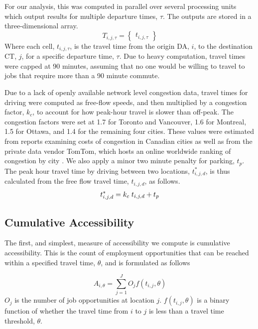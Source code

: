 \documentclass[11 pt, letterpaper]{article}
\begin{document}
{%

For our analysis, this was computed in parallel over several processing units which output results for multiple departure times, $\tau$. The outputs are stored in a three-dimensional array. 
\begin{equation}
T_{i,j,\tau} = \begin{Bmatrix}{t_{i,j,\tau}}\end{Bmatrix}
\end{equation}
Where each cell, $t_{i,j,\tau}$, is the travel time from the origin DA, $i$, to the destination CT, $j$, for a specific departure time, $\tau$. Due to heavy computation, travel times were capped at 90 minutes, assuming that no one would be willing to travel to jobs that require more than a 90 minute commute.

Due to a lack of openly available network level congestion data, travel times for driving were computed as free-flow speeds, and then multiplied by a congestion factor, $k_c$, to account for how peak-hour travel is slower than off-peak. The congestion factors were set at 1.7 for Toronto and Vancouver, 1.6 for Montreal, 1.5 for Ottawa, and 1.4 for the remaining four cities. These values were estimated from reports examining costs of congestion in Canadian cities \cite{metrolinx2008,cong2012} as well as from the private data vendor TomTom, which hosts an online worldwide ranking of congestion by city \cite{tomtom2018}. We also apply a minor two minute penalty for parking, $t_p$. The peak hour travel time by driving between two locations, $t_{i,j,d}^*$, is thus calculated from the free flow travel time, $t_{i,j,d}$, as follows.
\begin{equation}
t_{i,j,d}^* = k_c \hspace{1mm} t_{i,j,d} + t_p
\end{equation}




\subsection{Cumulative Accessibility}

The first, and simplest, measure of accessibility we compute is cumulative accessibility. This is the count of employment opportunities that can be reached within a specified travel time, $\theta$, and is formulated as follows

\begin{equation}
A_{i,\theta} = \sum_{j = 1}^{J} O_j f(t_{i,j},\theta) 
\end{equation}
$O_j$ is the number of job opportunities at location $j$.  $f(t_{i,j},\theta) $ is a binary function of whether the travel time from $i$ to $j$ is less than a travel time threshold, $\theta$.

}
\end{document}
